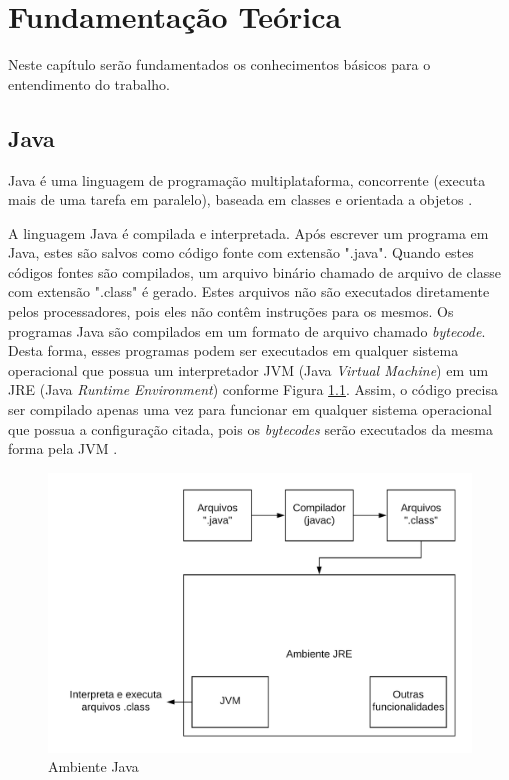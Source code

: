 \chapter{Fundamentação Teórica}
\label{ch:fundamentacao}
\par Neste capítulo ser\~ao fundamentados os conhecimentos b\'asicos para o entendimento do trabalho.

\section{Java}

\par Java é uma linguagem de programação multiplataforma, concorrente (executa mais de uma tarefa em paralelo), baseada em classes e orientada a objetos \cite{joy2000java}.
\par A linguagem Java é compilada e interpretada. Após escrever um programa em Java, estes são salvos como código fonte com extensão ".java". Quando estes códigos fontes são compilados, um arquivo binário chamado de arquivo de classe com extensão ".class" é gerado. Estes arquivos não são executados diretamente pelos processadores, pois eles não contêm instruções para os mesmos. Os programas Java são compilados em um formato de arquivo chamado \textit{bytecode}. Desta forma, esses programas podem ser executados em qualquer sistema operacional que possua um interpretador JVM (Java \textit{Virtual Machine}) em um JRE (Java \textit{Runtime} \textit{Environment}) conforme Figura \ref{fig:ambiente java}. Assim, o código precisa ser compilado apenas uma vez para funcionar em qualquer sistema operacional que possua a configuração citada, pois os \textit{bytecodes} serão executados da mesma forma pela JVM \cite{arnold2005java}.

\begin{figure}[H]
    \centering
    \includegraphics[scale=0.2]{src/imagens/cap1/ambiente-java.png}
    \caption{Ambiente Java}
    \label{fig:ambiente java}
\end{figure}

